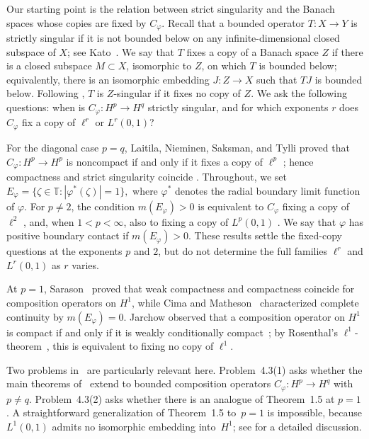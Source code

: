 \documentclass[11pt, reqno]{amsart}
\theoremstyle{definition}
\theoremstyle{remark}
\newcommand{\T}{\mathbb{T}}
\begin{document}
Our starting point is the relation between strict singularity and the
Banach spaces whose copies are fixed by \(C_\varphi\). Recall that a
bounded operator \(T:X\to Y\) is strictly singular if it is not bounded
below on any infinite-dimensional closed subspace of \(X\); see
Kato~\cite{Kato1958}. We say that \(T\) fixes a copy of a Banach space \(Z\) if there is a
closed subspace \(M\subset X\), isomorphic to \(Z\), on which \(T\)
is bounded below; equivalently, there is an isomorphic embedding
\(J:Z\to X\) such that \(TJ\) is bounded below. Following
\cite{LNST2017}, \(T\) is \(Z\)-singular if it fixes no copy of \(Z\). We ask the following questions: when is
\(C_\varphi:H^p\to H^q\) strictly singular, and for which exponents
\(r\) does \(C_\varphi\) fix a copy of \(\ell^r\) or \(L^r(0,1)\)?



For the diagonal case \(p=q\), Laitila, Nieminen, Saksman, and Tylli
proved that \(C_\varphi:H^p\to H^p\) is noncompact if and only if it
fixes a copy of \(\ell^p\)
\cite[Theorem~1.2]{LNST2017}; hence compactness and strict
singularity coincide
\cite[Corollary~1.3]{LNST2017}. Throughout, we set
\(
E_{\varphi}=\{\zeta\in\T:|\varphi^{*}(\zeta)|=1\},
\)
where \(\varphi^*\) denotes the radial boundary limit function of
\(\varphi\). For \(p\ne2\), the condition \(m(E_\varphi)>0\) is
equivalent to \(C_\varphi\) fixing a copy of \(\ell^2\)
\cite[Theorem~1.4]{LNST2017}, and, when \(1<p<\infty\), also to
fixing a copy of \(L^p(0,1)\)
\cite[Theorem~1.5]{LNST2017}. We say that \(\varphi\) has positive
boundary contact if \(m(E_\varphi)>0\). These results settle the
fixed-copy questions at the exponents \(p\) and \(2\), but do not
determine the full families \(\ell^r\) and \(L^r(0,1)\) as \(r\)
varies.

At \(p=1\), Sarason~\cite{Sarason1992} proved that weak compactness
and compactness coincide for composition operators on \(H^1\), while
Cima and Matheson~\cite{CimaMatheson1994} characterized complete
continuity by \(m(E_\varphi)=0\). Jarchow observed that a composition
operator on \(H^1\) is compact if and only if it is weakly
conditionally compact~\cite[p.~95]{Jarchow1998}; by Rosenthal's
\(\ell^1\)-theorem~\cite{Rosenthal1974}, this is equivalent to fixing
no copy of \(\ell^1\).



Two problems in~\cite{LNST2017} are particularly relevant here. Problem~4.3(1) asks whether the main theorems of~\cite{LNST2017} extend
to bounded composition operators $C_{\varphi}:H^{p}\to H^{q}$ with
$p\neq q$. Problem~4.3(2) asks whether there is an analogue of
Theorem~1.5 at \(p=1\). A straightforward
generalization of Theorem~1.5 to~$p=1$ is impossible, because $L^{1}(0,1)$
admits no isomorphic embedding into~$H^{1}$; see \cite[p.~262]{KwapienPelczynski1976} for a detailed
discussion.
\end{document}
